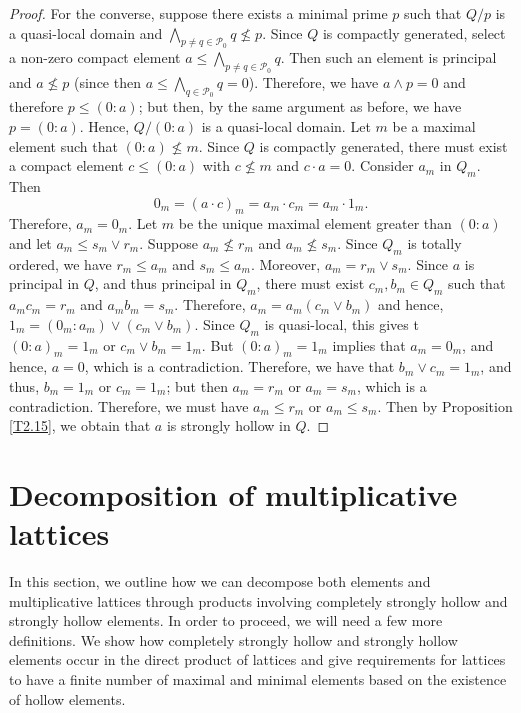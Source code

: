 \documentclass[11pt,english]{amsart}
\theoremstyle{definition}
\numberwithin{equation}{section}
\theoremstyle{remark}
\def\leq{\leqslant}
\begin{document}
\begin{proof}
		For the converse, suppose there exists a minimal prime $p$ such that $Q/p$ is a quasi-local domain and $\bigwedge_{p\neq q\in \mathcal{P}_0}q\nleq p$. Since $Q$ is compactly generated, select a non-zero compact element $a\leq\bigwedge_{p\neq q\in \mathcal{P}_0}q$. Then such an element is principal and $a\nleq p$ (since then $a\leq\bigwedge_{q\in \mathcal{P}_0}q=0$). Therefore, we have  $a\wedge p=0$ and therefore $p\leq (0:a)$; but then, by the same argument as before, we have  $p=(0:a)$. Hence, $Q/(0:a)$ is a quasi-local domain. Let $m$ be a maximal element such that $(0:a)\nleq m$. Since $Q$ is compactly generated,  there must exist a compact element $c\leq(0:a)$ with $c\nleq m$ and $c\cdot a=0$. Consider \(a_{m}\) in $Q_{m}$. Then \[ 0_m=(a\cdot c)_m=a_m\cdot c_m=a_m\cdot 1_m.\] Therefore, $a_m=0_m$. Let $m$ be the unique maximal element greater than $(0:a)$ and let $a_m\leq s_m\vee r_m$. Suppose $a_m\nleq r_m$ and $a_m \nleq s_m$. Since $Q_m$ is totally ordered, we have  $r_m\leq a_m$ and $s_m\leq a_m$. Moreover, $a_m=r_m\vee s_m$. Since $a$ is principal in $Q$, and thus principal in $Q_m$, there must exist $c_m, b_m\in Q_m$ such that $a_mc_m=r_m$ and $a_mb_m=s_m$. Therefore, $a_m=a_m(c_m\vee b_m)$ and hence, $1_m=(0_m:a_m)\vee(c_m\vee b_m)$. Since $Q_m$ is quasi-local, this gives t $(0:a)_m=1_m$ or $c_m\vee b_m=1_m$. But $(0:a)_m=1_m$ implies that $a_m=0_m$, and hence, $a=0$, which is a contradiction. Therefore, we have that $b_m\vee c_m=1_m$, and thus, $b_m=1_m$ or $c_m=1_m$; but then $a_m=r_m$ or $a_m=s_m$, which is a contradiction. Therefore, we must have  $a_m\leq r_m$ or $a_m\leq s_m$. Then by Proposition \ref{T2.15}, we obtain that $a$ is strongly hollow in $Q$.
	\end{proof}
	\smallskip
	
	\section{Decomposition of multiplicative lattices}
	\label{dml}
	
	In this section, we outline how we can decompose both elements and multiplicative lattices through products involving completely strongly hollow and strongly hollow elements. In order to proceed, we will need a few more definitions. 
	We show how completely strongly hollow and strongly hollow elements occur in the direct product of lattices and give requirements for lattices to have a finite number of maximal and minimal elements based on the existence of hollow elements. 
	
\end{document}
